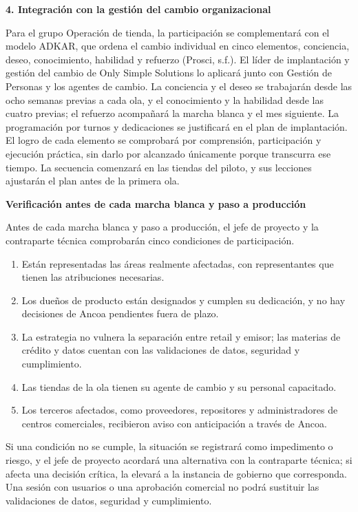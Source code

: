 \documentclass[11pt]{article}
\begin{document}
\textbf{4. Integración con la gestión del cambio organizacional}

Para el grupo Operación de tienda, la participación se complementará con
el modelo ADKAR, que ordena el cambio individual en cinco elementos,
conciencia, deseo, conocimiento, habilidad y refuerzo (Prosci, s.f.). El
líder de implantación y gestión del cambio de Only Simple Solutions lo
aplicará junto con Gestión de Personas y los agentes de cambio. La
conciencia y el deseo se trabajarán desde las ocho semanas previas a
cada ola, y el conocimiento y la habilidad desde las cuatro previas; el
refuerzo acompañará la marcha blanca y el mes siguiente. La programación
por turnos y dedicaciones se justificará en el plan de implantación. El
logro de cada elemento se comprobará por comprensión, participación y
ejecución práctica, sin darlo por alcanzado únicamente porque transcurra
ese tiempo. La secuencia comenzará en las tiendas del piloto, y sus
lecciones ajustarán el plan antes de la primera ola.

\textbf{Verificación antes de cada marcha blanca y paso a producción}

Antes de cada marcha blanca y paso a producción, el jefe de proyecto y
la contraparte técnica comprobarán cinco condiciones de participación.

\begin{enumerate}
\def\labelenumi{\arabic{enumi}.}
\item
  Están representadas las áreas realmente afectadas, con representantes
  que tienen las atribuciones necesarias.
\item
  Los dueños de producto están designados y cumplen su dedicación, y no
  hay decisiones de Ancoa pendientes fuera de plazo.
\item
  La estrategia no vulnera la separación entre retail y emisor; las
  materias de crédito y datos cuentan con las validaciones de datos,
  seguridad y cumplimiento.
\item
  Las tiendas de la ola tienen su agente de cambio y su personal
  capacitado.
\item
  Los terceros afectados, como proveedores, repositores y
  administradores de centros comerciales, recibieron aviso con
  anticipación a través de Ancoa.
\end{enumerate}

Si una condición no se cumple, la situación se registrará como
impedimento o riesgo, y el jefe de proyecto acordará una alternativa con
la contraparte técnica; si afecta una decisión crítica, la elevará a la
instancia de gobierno que corresponda. Una sesión con usuarios o una
aprobación comercial no podrá sustituir las validaciones de datos,
seguridad y cumplimiento.
\end{document}
